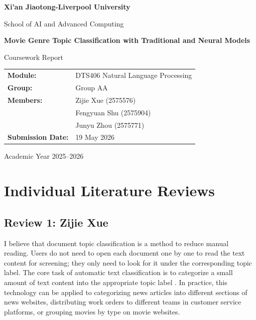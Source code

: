 \documentclass[12pt,a4paper]{article}
\newcommand{\reporttitle}{Movie Genre Topic Classification with Traditional and Neural Models}
\newcommand{\groupid}{Group AA}
\newcommand{\modulename}{DTS406 Natural Language Processing}
\newcommand{\submissiondate}{19 May 2026}
\begin{document}
\begin{titlepage}
    \centering
    \vspace*{1.5cm}
    {\Large \textbf{Xi'an Jiaotong-Liverpool University}\par}
    \vspace{0.4cm}
    {\large School of AI and Advanced Computing\par}
    \vspace{2cm}
    {\huge \textbf{\reporttitle}\par}
    \vspace{1.2cm}
    {\Large Coursework Report\par}
    \vspace{2cm}
    \begin{tabular}{>{\bfseries}p{4cm}p{8.5cm}}
        Module: & \modulename \\
        Group: & \groupid \\
        Members: & Zijie Xue (2575576)\\
                 & Fengyuan Shu (2575904)\\
                 & Junyu Zhou (2575771)\\
        Submission Date: & \submissiondate \\
    \end{tabular}
    \vfill
    {\large Academic Year 2025--2026\par}
\end{titlepage}

\newpage
\tableofcontents
\newpage

\section{Individual Literature Reviews}
\subsection{Review 1: Zijie Xue}
I believe that document topic classification is a method to reduce manual reading. Users do not need to open each document one by one to read the text content for screening; they only need to look for it under the corresponding topic label. The core task of automatic text classification is to categorize a small amount of text content into the appropriate topic label \cite{sebastiani2002}. In practice, this technology can be applied to categorizing news articles into different sections of news websites, distributing work orders to different teams in customer service platforms, or grouping movies by type on movie websites.
\end{document}
